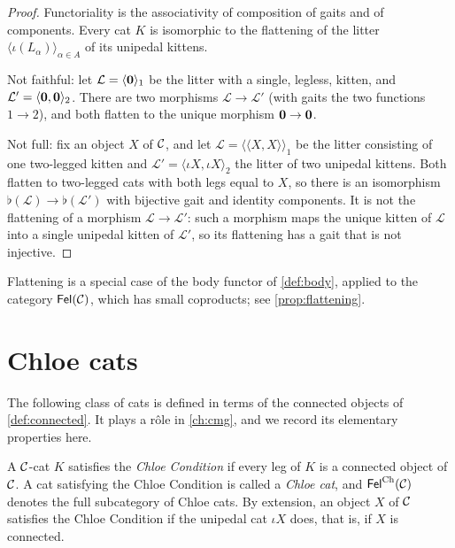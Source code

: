\begin{proof}
Functoriality is the associativity of composition of gaits and of
components. Every cat $K$ is isomorphic to the flattening of the litter
$\langle\iota(L_\alpha)\rangle_{\alpha\in A}$ of its unipedal kittens.

Not faithful: let $\mathcal L=\langle\mathbf{0}\rangle_{1}$ be the litter with a
single, legless, kitten, and $\mathcal L'=\langle\mathbf{0},\mathbf{0}\rangle_{2}$.
There are two morphisms $\mathcal L\to\mathcal L'$ (with gaits the two
functions $1\to 2$), and both flatten to the unique morphism
$\mathbf{0}\to\mathbf{0}$.

Not full: fix an object $X$ of $\mathcal{C}$, and let $\mathcal L=\langle\langle X,X\rangle\rangle_1$
be the litter consisting of one two-legged kitten and
$\mathcal L'=\langle\iota X,\iota X\rangle_2$ the litter of two unipedal
kittens. Both flatten to two-legged cats with both legs equal to $X$, so there
is an isomorphism $\flat(\mathcal L)\to\flat(\mathcal L')$ with bijective gait
and identity components. It is not the flattening of a morphism
$\mathcal L\to\mathcal L'$: such a morphism maps the unique kitten of
$\mathcal L$ into a single unipedal kitten of $\mathcal L'$, so its flattening
has a gait that is not injective.
\end{proof}

\begin{remark}\label{rem:flattening-body}
Flattening is a special case of the body functor of \cref{def:body}, applied
to the category $\mathsf{Fel}(\mathcal{C})$, which has small coproducts; see
\cref{prop:flattening}.
\end{remark}

\section{Chloe cats}\label{sec:chloe}

The following class of cats is defined in terms of the connected objects of
\cref{def:connected}. It plays a r\^ole in \cref{ch:cmg}, and we record its
elementary properties here.

\begin{definition}\label{def:chloe}
A $\mathcal{C}$-cat $K$ satisfies the \emph{Chloe Condition} if every leg of $K$ is a
connected object of $\mathcal{C}$. A cat satisfying the Chloe Condition is called a
\emph{Chloe cat}, and $\mathsf{Fel}^{\mathrm{Ch}}(\mathcal{C})$ denotes the full subcategory of Chloe
cats. By extension, an object $X$ of $\mathcal{C}$ satisfies the Chloe Condition if the
unipedal cat $\iota X$ does, that is, if $X$ is connected.
\end{definition}

